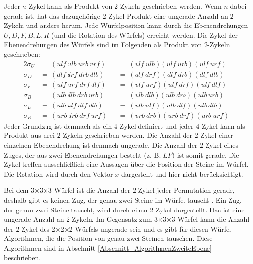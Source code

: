 \documentclass[12pt,a4paper, usenames, dvipsnames]{article}
\theoremstyle{mystyle}
\theoremstyle{definition}
\newcommand{\Ttwo}{2$\times$2$\times$2-}
\newcommand{\Tthree}{3$\times$3$\times$3-}
\begin{document}
Jeder $n$-Zykel kann als Produkt von $2$-Zykeln geschrieben werden. Wenn $n$ dabei gerade ist, hat das dazugehörige $2$-Zykel-Produkt eine ungerade Anzahl an $2$-Zykeln und anders herum. \cite{TD}
Jede Würfelposition kann durch die Ebenendrehungen $U, D, F, B, L, R$ (und die Rotation des Würfels) erreicht werden. 
Die Zykel der Ebenendrehungen des Würfels sind im Folgenden als Produkt von $2$-Zykeln geschrieben:
\begin{alignat*}{2}
\sigma_U &  = \ ( \textit{ulf} \ \textit{ulb} \ \textit{urb} \ \textit{urf} ) &&  = \ ( \textit{ulf} \ \textit{ulb} ) 
( \textit{ulf} \ \textit{urb} ) 
( \textit{ulf} \  \textit{urf} )\\

\sigma_D & = \ ( \textit{dlf} \ \textit{drf} \ \textit{drb} \ \textit{dlb} )  && = \ ( \textit{dlf} \ \textit{drf} ) 
( \textit{dlf} \ \textit{drb}  ) 
( \textit{dlf} \ \textit{dlb} )\\

\sigma_F & = \ ( \textit{ulf} \ \textit{urf} \ \textit{drf} \ \textit{dlf} )  && = \ ( \textit{ulf} \ \textit{urf} )
( \textit{ulf} \ \textit{drf} )
( \textit{ulf}  \ \textit{dlf} ) \\

\sigma_B & = \ ( \textit{ulb} \ \textit{dlb} \ \textit{drb} \ \textit{urb} )  && = \ ( \textit{ulb} \ \textit{dlb} )
( \textit{ulb} \  \textit{drb} )
( \textit{ulb}  \ \textit{urb} )\\

\sigma_L & = \ ( \textit{ulb} \ \textit{ulf} \ \textit{dlf} \ \textit{dlb} )  && = \ ( \textit{ulb} \ \textit{ulf} ) 
( \textit{ulb} \ \textit{dlf}  ) 
( \textit{ulb} \ \textit{dlb} ) \\

\sigma_R & = \ ( \textit{urb} \ \textit{drb} \ \textit{drf} \ \textit{urf} ) && = \  ( \textit{urb} \ \textit{drb}  ) 
( \textit{urb} \  \textit{drf} ) 
( \textit{urb} \ \textit{urf} )  \
\end{alignat*}
Jeder Grundzug ist demnach als ein $4$-Zykel definiert und jeder $4$-Zykel kann als Produkt aus drei $2$-Zykeln geschrieben werden. 
Die Anzahl der $2$-Zykel einer einzelnen Ebenendrehung ist demnach ungerade. Die Anzahl der $2$-Zykel eines Zuges, der aus zwei Ebenendrehungen besteht (z. B. $LF$) ist somit gerade.
Die Zykel treffen ausschließlich eine Aussagen über die Position der Steine im Würfel. Die Rotation wird durch den Vektor $x$ dargestellt und hier nicht berücksichtigt. 

Bei dem \Tthree Würfel ist die Anzahl der $2$-Zykel jeder Permutation gerade, deshalb gibt es keinen Zug, der genau zwei Steine im Würfel tauscht \cite{TD}. Ein Zug, der genau zwei Steine tauscht, wird durch einen $2$-Zykel dargestellt. Das ist eine ungerade Anzahl an $2$-Zykeln. Im Gegensatz zum \Tthree Würfel kann die Anzahl der $2$-Zykel des \Ttwo Würfels ungerade sein und es gibt für diesen Würfel Algorithmen, die die Position von genau zwei Steinen tauschen. Diese Algorithmen sind in Abschnitt \ref{Abschnitt_AlgorithmenZweiteEbene} beschrieben. 
\end{document}
